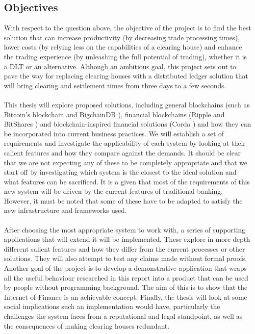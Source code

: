 \documentclass[12pt,twoside]{article}
\begin{document}
\subsection{Objectives}
\label{sec:Objectives}
With respect to the question above, the objective of the project is to find the best solution that can increase productivity (by decreasing trade processing times), lower costs (by relying less on the capabilities of a clearing house) and enhance the trading experience (by unleashing the full potential of trading), whether it is a DLT or an alternative. Although an ambitious goal, this project sets out to pave the way for replacing clearing houses with a distributed ledger solution that will bring clearing and settlement times from three days to a few seconds. 
\\ \\
This thesis will explore proposed solutions, including general blockchains (such as Bitcoin's blockchain \cite{SNakamoto:Bitcoin} and BigchainDB \cite{DBC}), financial blockchains (Ripple \cite{Ripple:docs} and BitShares \cite{BS:tech}) and blockchain-inspired financial solutions (Corda \cite{Corda:code}) and how they can be incorporated into current business practices. We will establish a set of requirements and investigate the applicability of each system by looking at their salient features and how they compare against the demands. It should be clear that we are not expecting any of these to be completely appropriate and that we start off by investigating which system is the closest to the ideal solution and what features can be sacrificed. It is a given that most of the requirements of this new system will be driven by the current features of traditional banking. However, it must be noted that some of these have to be adapted to satisfy the new infrastructure and frameworks used.
\\ \\
After choosing the most appropriate system to work with, a series of supporting applications that will extend it will be implemented. These explore in more depth different salient features and how they differ from the current processes or other solutions. They will also attempt to test any claims made without formal proofs. Another goal of the project is to develop a demonstrative application that wraps all the useful behaviour researched in this report into a product that can be used by people without programming background. The aim of this is to show that the Internet of Finance \cite{CMM:RN} is an achievable concept. Finally, the thesis will look at some social implications such an implementation would have, particularly the challenges the system faces from a reputational and legal standpoint, as well as the consequences of making clearing houses redundant.
\end{document}
